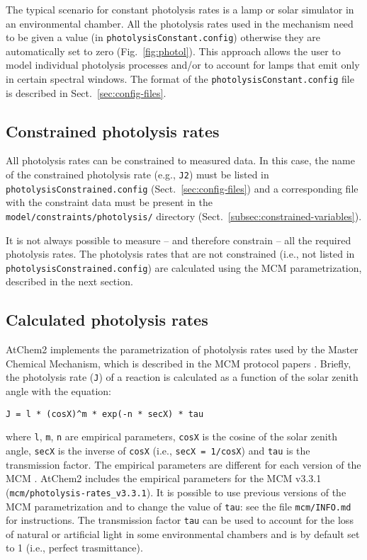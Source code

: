 The typical scenario for constant photolysis rates is a lamp or solar
simulator in an environmental chamber. All the photolysis rates used
in the mechanism need to be given a value (in
\texttt{photolysisConstant.config}) otherwise they are automatically
set to zero (Fig.~\ref{fig:photol}). This approach allows the user to
model individual photolysis processes and/or to account for lamps that
emit only in certain spectral windows. The format of the
\texttt{photolysisConstant.config} file is described in
Sect.~\ref{sec:config-files}.

\subsection{Constrained photolysis rates} \label{subsec:constrained-photolysis-rates}

All photolysis rates can be constrained to measured data. In this
case, the name of the constrained photolysis rate (e.g., \texttt{J2})
must be listed in \texttt{photolysisConstrained.config}
(Sect.~\ref{sec:config-files}) and a corresponding file with the
constraint data must be present in the
\texttt{model/constraints/photolysis/} directory
(Sect.~\ref{subsec:constrained-variables}).

It is not always possible to measure -- and therefore constrain -- all
the required photolysis rates. The photolysis rates that are not
constrained (i.e., not listed in \texttt{photolysisConstrained.config})
are calculated using the MCM parametrization, described in the next
section.

\subsection{Calculated photolysis rates} \label{subsec:calculated-photolysis-rates}

AtChem2 implements the parametrization of photolysis rates used by the
Master Chemical Mechanism, which is described in the MCM protocol
papers \citep{jenkin_1997, saunders_2003}. Briefly, the photolysis
rate (\texttt{J}) of a reaction is calculated as a function of the
solar zenith angle with the equation:

\begin{verbatim}
J = l * (cosX)^m * exp(-n * secX) * tau
\end{verbatim}

where \texttt{l}, \texttt{m}, \texttt{n} are empirical parameters,
\texttt{cosX} is the cosine of the solar zenith angle, \texttt{secX}
is the inverse of \texttt{cosX} (i.e., \texttt{secX\ =\ 1/cosX}) and
\texttt{tau} is the transmission factor. The empirical parameters are
different for each version of the MCM \citep{sommariva_2019}. AtChem2
includes the empirical parameters for the MCM v3.3.1
(\texttt{mcm/photolysis-rates\_v3.3.1}). It is possible to use
previous versions of the MCM parametrization and to change the value
of \texttt{tau}: see the file \texttt{mcm/INFO.md} for
instructions. The transmission factor \texttt{tau} can be used to
account for the loss of natural or artificial light in some
environmental chambers and is by default set to 1 (i.e., perfect
trasmittance).  

